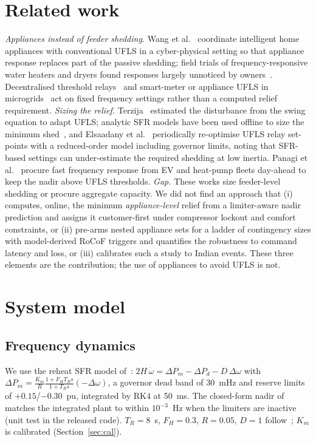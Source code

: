 \documentclass[conference]{IEEEtran}
\begin{document}
\section{Related work}
\emph{Appliances instead of feeder shedding.} Wang et al.~\cite{wang2016} coordinate intelligent home appliances with conventional UFLS in a cyber-physical setting so that appliance response replaces part of the passive shedding; field trials of frequency-responsive water heaters and dryers found responses largely unnoticed by owners~\cite{pnnl2014}. Decentralised threshold relays~\cite{short2007,molina2011} and smart-meter or appliance UFLS in microgrids~\cite{xu2023} act on fixed frequency settings rather than a computed relief requirement.
\emph{Sizing the relief.} Terzija~\cite{terzija2006} estimated the disturbance from the swing equation to adapt UFLS; analytic SFR models have been used offline to size the minimum shed~\cite{elzawawy2019}, and Elsaadany et al.~\cite{elsaadany2025} periodically re-optimise UFLS relay set-points with a reduced-order model including governor limits, noting that SFR-based settings can under-estimate the required shedding at low inertia. Panagi et al.~\cite{panagi2026} procure fast frequency response from EV and heat-pump fleets day-ahead to keep the nadir above UFLS thresholds.
\emph{Gap.} These works size feeder-level shedding or procure aggregate capacity. We did not find an approach that (i) computes, online, the minimum \emph{appliance-level} relief from a limiter-aware nadir prediction and assigns it customer-first under compressor lockout and comfort constraints, or (ii) pre-arms nested appliance sets for a ladder of contingency sizes with model-derived RoCoF triggers and quantifies the robustness to command latency and loss, or (iii) calibrates such a study to Indian events. These three elements are the contribution; the use of appliances to avoid UFLS is not.

\section{System model}
\subsection{Frequency dynamics}
We use the reheat SFR model of~\cite{anderson1990}: $2H\,\dot{\omega}=\Delta P_m-\Delta P_d-D\,\Delta\omega$ with $\Delta P_m=\frac{K_m}{R}\frac{1+F_HT_Rs}{1+T_Rs}(-\Delta\omega)$, a governor dead band of 30~mHz and reserve limits of $+0.15$/$-0.30$~pu, integrated by RK4 at 50~ms. The closed-form nadir of~\cite{anderson1990} matches the integrated plant to within $10^{-3}$~Hz when the limiters are inactive (unit test in the released code). $T_R=8$~s, $F_H=0.3$, $R=0.05$, $D=1$ follow~\cite{anderson1990}; $K_m$ is calibrated (Section~\ref{sec:cal}).
\end{document}
